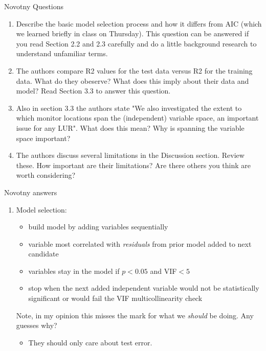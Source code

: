 \documentclass[aspectratio=169, handout]{beamer}
\begin{document}
\begin{frame}{Novotny Questions}
\begin{enumerate}
  \item Describe the basic model selection process and how it differs from AIC (which we learned briefly in class on Thursday).  This question can be answered if you read Section 2.2 and 2.3 carefully and do a little background research to understand unfamiliar terms. 
  \item The authors compare R2 values for the test data versus R2 for the training data.  What do they obeserve?  What does this imply about their data and model?  Read Section 3.3 to answer this question.  
  \item  Also in section 3.3 the authors state "We also investigated the extent to which monitor locations span the (independent) variable space, an important issue for any LUR".  What does this mean?  Why is spanning the variable space important?
  \item The authors discuss several limitations in the Discussion section.  Review these.  How important are their limitations?  Are there others you think are worth considering?
\end{enumerate}
\end{frame}

\begin{frame}{Novotny answers}
\begin{enumerate}
  \item Model selection:
  \begin{itemize}
    \item build model by adding variables sequentially
    \item variable most correlated with \textit{residuals} from prior model added to next candidate
    \item variables stay in the model if $p<0.05$ and VIF$<5$
    \item stop when the next added independent variable would not be statistically significant or would fail the VIF multicollinearity check
  \end{itemize}
  Note, in my opinion this misses the mark for what we \textit{should} be doing.  Any guesses why?
  \pause
  \begin{itemize}
    \item They should only care about test error.  
  \end{itemize}
  
\end{enumerate}
\end{frame}
\end{document}
